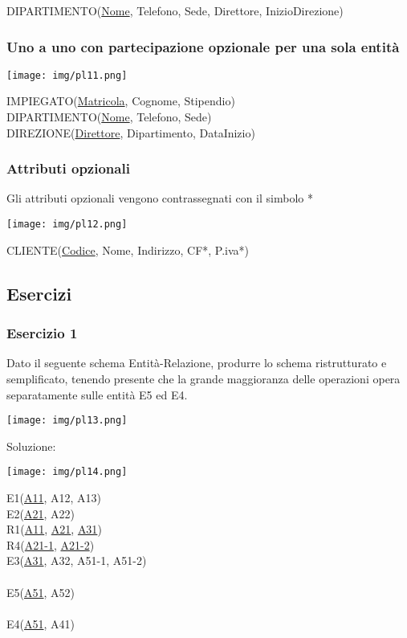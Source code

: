 \documentclass[a4paper]{article}
\begin{document}
DIPARTIMENTO(\underline{Nome}, Telefono, Sede, Direttore, InizioDirezione)\par \subsubsection{Uno a uno con partecipazione opzionale per una sola entità}
\begin{center}
      \texttt{[image: img/pl11.png]}
\end{center}\par IMPIEGATO(\underline{Matricola}, Cognome, Stipendio)\\
DIPARTIMENTO(\underline{Nome}, Telefono, Sede)\\
DIREZIONE(\underline{Direttore}, Dipartimento, DataInizio)\par \subsubsection{Attributi opzionali}
Gli attributi opzionali vengono contrassegnati con il simbolo *
\begin{center}
      \texttt{[image: img/pl12.png]}
\end{center}\par CLIENTE(\underline{Codice}, Nome, Indirizzo, CF*, P.iva*)\par \subsection{Esercizi}
\subsubsection{Esercizio 1}
Dato il seguente schema Entità-Relazione, produrre lo schema ristrutturato e semplificato, tenendo presente che la grande maggioranza delle operazioni opera separatamente sulle entità E5 ed E4.
\begin{center}
      \texttt{[image: img/pl13.png]}
\end{center}
Soluzione:
\begin{center}
      \texttt{[image: img/pl14.png]}
\end{center}
E1(\underline{A11}, A12, A13)\\
E2(\underline{A21}, A22)\\
R1(\underline{A11}, \underline{A21}, \underline{A31})\\
R4(\underline{A21-1}, \underline{A21-2})\\
E3(\underline{A31}, A32, A51-1, A51-2)\\
\\
E5(\underline{A51}, A52)\\
\\
E4(\underline{A51}, A41)\\
\end{document}
